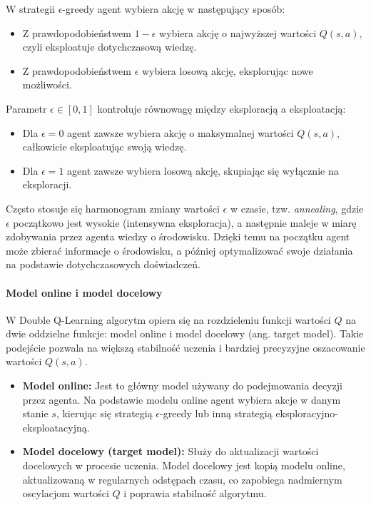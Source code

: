 W strategii \(\epsilon\)-greedy agent wybiera akcję w następujący sposób:
\begin{itemize}
	\item Z prawdopodobieństwem \(1 - \epsilon\) wybiera akcję o najwyższej wartości \(Q(s, a)\), czyli eksploatuje dotychczasową wiedzę.
	\item Z prawdopodobieństwem \(\epsilon\) wybiera losową akcję, eksplorując nowe możliwości.
\end{itemize}

Parametr \(\epsilon \in [0, 1]\) kontroluje równowagę między eksploracją a eksploatacją:
\begin{itemize}
	\item Dla \(\epsilon = 0\) agent zawsze wybiera akcję o maksymalnej wartości \(Q(s, a)\), całkowicie eksploatując swoją wiedzę.
	\item Dla \(\epsilon = 1\) agent zawsze wybiera losową akcję, skupiając się wyłącznie na eksploracji.
\end{itemize}

Często stosuje się harmonogram zmiany wartości \(\epsilon\) w czasie, tzw. \textit{annealing}, gdzie \(\epsilon\) początkowo jest wysokie (intensywna eksploracja), a następnie maleje w miarę zdobywania przez agenta wiedzy o środowisku. Dzięki temu na początku agent może zbierać informacje o środowisku, a później optymalizować swoje działania na podstawie dotychczasowych doświadczeń.

\paragraph{Model online i model docelowy}

W Double Q-Learning algorytm opiera się na rozdzieleniu funkcji wartości \(Q\) na dwie oddzielne funkcje: model online i model docelowy (ang. target model). Takie podejście pozwala na większą stabilność uczenia i bardziej precyzyjne oszacowanie wartości \(Q(s, a)\).

\begin{itemize}
	\item \textbf{Model online:} Jest to główny model używany do podejmowania decyzji przez agenta. Na podstawie modelu online agent wybiera akcje w danym stanie \(s\), kierując się strategią \( \epsilon\)-greedy lub inną strategią eksploracyjno-eksploatacyjną.
	\item \textbf{Model docelowy (target model):} Służy do aktualizacji wartości docelowych w procesie uczenia. Model docelowy jest kopią modelu online, aktualizowaną w regularnych odstępach czasu, co zapobiega nadmiernym oscylacjom wartości \(Q\) i poprawia stabilność algorytmu.
\end{itemize}

